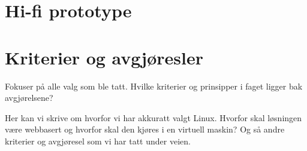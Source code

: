 \section{Hi-fi prototype}

\section{Kriterier og avgjøresler}
Fokuser på alle valg som ble tatt. Hvilke kriterier og 
prinsipper i faget ligger bak avgjørelsene? 

Her kan vi skrive om hvorfor vi har akkuratt valgt Linux. Hvorfor skal løsningen være webbasert og hvorfor skal den kjøres i en virtuell maskin? Og så andre kriterier og avgjøresel som vi har tatt under veien. 